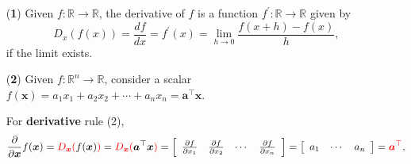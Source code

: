 \documentclass[12pt,thmsa]{article}
\begin{document}
\begin{itemize}
	\item[({\bf{1}})] Given \(f: \mathbb{R} \rightarrow \mathbb{R}\), the derivative of \(f\) is a function \(f^{\prime}: \mathbb{R} \rightarrow \mathbb{R}\) given by
	\[
	D_{x}(f(x)) = \frac{d f}{d x} = f^{\prime}(x)=\lim _{h \rightarrow 0} \frac{f(x+h)-f(x)}{h},
	\]
	if the limit exists.
	
	\item[({\bf{2}})] Given \(f: \mathbb{R}^{n} \rightarrow \mathbb{R}\), consider a scalar \( f(\boldsymbol{x}) = a_{1} x_{1}+a_{2} x_{2}+\cdots+a_{n} x_{n} =  \boldsymbol{a}^{\top} \boldsymbol{x}\).

	For \textbf{derivative} rule (2), 
	\[ {\color{black}{
			\frac{\partial}{\partial \boldsymbol{x}}}} f( \boldsymbol{x} ) 
	={\color{red}{D_{\boldsymbol{x}}(}}{ f(\boldsymbol{x}) }{\color{red})}
	={\color{red}{D_{\boldsymbol{x}}(}}{ \boldsymbol{a}^{\top} \boldsymbol{x} }{\color{red})} =
	\left[\begin{array}{cccc}
		\frac{\partial f}{\partial x_{1}} & 
		\frac{\partial f}{\partial x_{2}} & 
		\cdots & 
		\frac{\partial f}{\partial x_{n}}
	\end{array}\right]
	=\left[\begin{array}{ccc}
		a_{1} & \cdots & a_{n}
	\end{array}
	\right] = {\color{red}{ \boldsymbol{a}^{\top} }},
	\]


\end{itemize}
\end{document}
